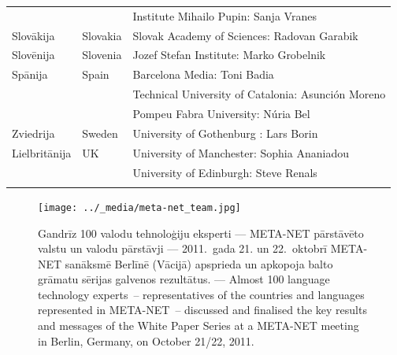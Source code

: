 \begin{longtable}{llp{105mm}}
    & & Institute Mihailo Pupin: Sanja Vranes \\ \addlinespace
  Slovākija & \textcolor{grey1}{Slovakia} & Slovak Academy of Sciences: Radovan Garabik \\ \addlinespace
  Slovēnija  & \textcolor{grey1}{Slovenia} & Jozef Stefan Institute: Marko Grobelnik \\ \addlinespace
  Spānija  & \textcolor{grey1}{Spain} & Barcelona Media: Toni Badia \\ \addlinespace
  & & Technical University of Catalonia: Asunción Moreno \\ \addlinespace  
  & & Pompeu Fabra University: Núria Bel \\ \addlinespace  
  Zviedrija  & \textcolor{grey1}{Sweden} & University of Gothenburg : Lars Borin \\ \addlinespace 
  Lielbritānija  & \textcolor{grey1}{UK} & University of Manchester: Sophia Ananiadou \\ \addlinespace 
    & & University of Edinburgh: Steve Renals \\ \addlinespace  
\end{longtable}
\normalsize

\renewcommand*{\figureformat}{}
\renewcommand*{\captionformat}{}

\makeatletter
\def\@makecaption#1#2{%
  \vskip\abovecaptionskip
 \hfil#1#2\hfil
  \vskip\belowcaptionskip
  }
\makeatother

\begin{figure}[htbp]
  \center
  \texttt{[image: ../\_media/meta-net\_team.jpg]}
  \caption{Gandrīz 100 valodu tehnoloģiju eksperti — META-NET pārstāvēto valstu un valodu pārstāvji — 2011.~gada 21. un 22.~oktobrī META-NET sanāksmē Berlīnē (Vācijā) apsprieda un apkopoja balto grāmatu sērijas galvenos rezultātus. --- \textcolor{grey1}{Almost 100 language technology experts~-- representatives of the countries and languages represented in META-NET~-- discussed and finalised the key results and messages of the White Paper Series at a META-NET meeting in Berlin, Germany, on October 21/22, 2011.}}
  \medskip
\end{figure}

\cleardoublepage



